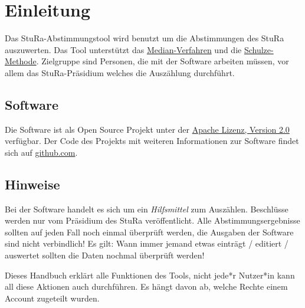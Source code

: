 %
%

\chapter{Einleitung}
Das StuRa-Abstimmungstool wird benutzt um die Abstimmungen des StuRa
auszuwerten.
Das Tool unterstützt das \href{https://de.wikipedia.org/wiki/Median}{Median-Verfahren}
und die \href{https://de.wikipedia.org/wiki/Schulze-Methode}{Schulze-Methode}.
Zielgruppe sind Personen, die mit der Software arbeiten müssen, vor allem das
StuRa-Präsidium welches die Auszählung durchführt.

\section*{Software}
Die Software ist als Open Source Projekt unter der \href{http://www.apache.org/licenses/LICENSE-2.0}{Apache Lizenz, Version 2.0}
verfügbar.
Der Code des Projekts mit weiteren Informationen zur Software findet sich auf
\href{https://github.com/FabianWe/stura-voting-django}{github.com}.

\section*{Hinweise}
Bei der Software handelt es sich um ein \emph{Hilfsmittel} zum Auszählen.
Beschlüsse werden nur vom Präsidium des StuRa veröffentlicht.
Alle Abstimmungsergebnisse sollten auf jeden Fall noch einmal überprüft werden,
die Ausgaben der Software sind nicht verbindlich!
Es gilt: Wann immer jemand etwas einträgt / editiert / auswertet sollten die
Daten nochmal überprüft werden!

Dieses Handbuch erklärt alle Funktionen des Tools, nicht jede*r Nutzer*in kann
all diese Aktionen auch durchführen.
Es hängt davon ab, welche Rechte einem Account zugeteilt wurden.
